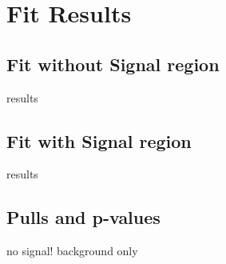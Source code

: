 \section{Fit Results}  %
\label{sec:results_fit}

\subsection{Fit without Signal region}
results

\subsection{Fit with Signal region}
results

\subsection{Pulls and p-values}
no signal! background only
